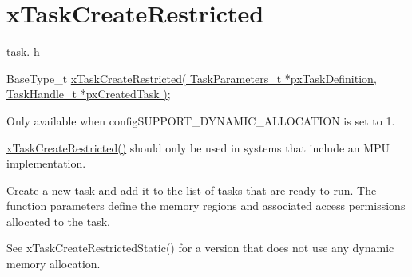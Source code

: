 \hypertarget{group__x_task_create_restricted}{}\section{x\+Task\+Create\+Restricted}
\label{group__x_task_create_restricted}
task. h 
\begin{DoxyPre}
BaseType\_t \hyperlink{vendor_2ceedling_2plugins_2freertos_2src_2freertos_2include_2task_8h_a61b00cd623953f4f94fe794057d7f648}{xTaskCreateRestricted( TaskParameters\_t *pxTaskDefinition, TaskHandle\_t *pxCreatedTask )};
\end{DoxyPre}


Only available when config\+S\+U\+P\+P\+O\+R\+T\+\_\+\+D\+Y\+N\+A\+M\+I\+C\+\_\+\+A\+L\+L\+O\+C\+A\+T\+I\+ON is set to 1.

\hyperlink{vendor_2ceedling_2plugins_2freertos_2src_2freertos_2include_2task_8h_a61b00cd623953f4f94fe794057d7f648}{x\+Task\+Create\+Restricted()} should only be used in systems that include an M\+PU implementation.

Create a new task and add it to the list of tasks that are ready to run. The function parameters define the memory regions and associated access permissions allocated to the task.

See x\+Task\+Create\+Restricted\+Static() for a version that does not use any dynamic memory allocation.


